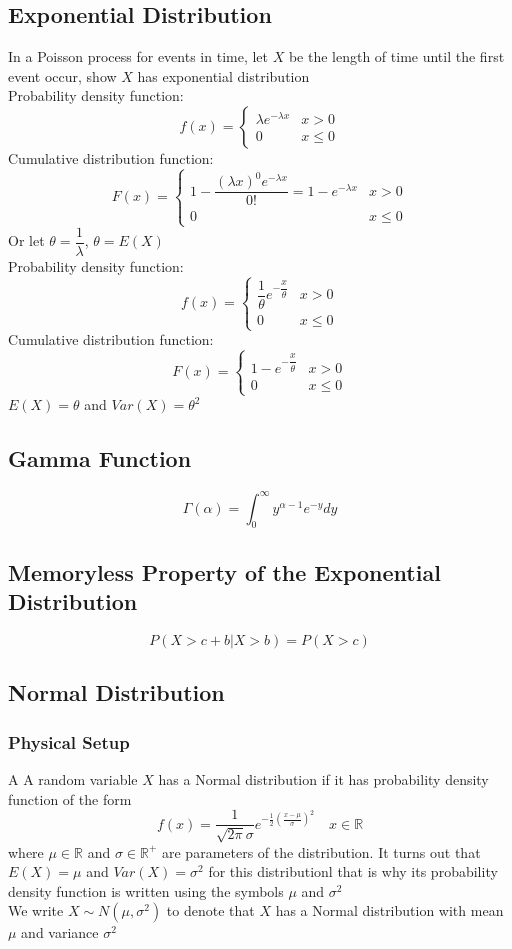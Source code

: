 \documentclass[11pt]{article}
\newcommand{\R}{{\mathbb{R}}}
\begin{document}
\subsection{Exponential Distribution}
In a Poisson process for events in time, let $X$ be the length of time until the first event occur, show $X$ has exponential distribution\\
Probability density function: \[f(x) = \begin{cases}
    \lambda e^{-\lambda x} &x>0 \\0 &x\leq 0
\end{cases}\]
Cumulative distribution function: \[F(x) = \begin{cases}
    1-\dfrac{(\lambda x)^0e^{-\lambda x}}{0!} = 1-e^{-\lambda x} &x>0 \\0 &x\leq 0
\end{cases}\]
Or let $\theta = \dfrac{1}{\lambda}$, $\theta = E(X)$ \\
Probability density function: \[f(x) = \begin{cases}
    \dfrac{1}{\theta} e^{-\dfrac{x}{\theta}} &x>0 \\0 &x\leq 0
\end{cases}\]
Cumulative distribution function: \[F(x) = \begin{cases}
    1-e^{-\dfrac{x}{\theta}} &x>0 \\0 &x\leq 0
\end{cases}\]
$E(X) = \theta$ and $Var(X) = \theta^2$
\subsection{Gamma Function}
\[\Gamma(\alpha) = \displaystyle\int_{0}^{\infty}y^{\alpha-1}e^{-y}dy\]
\subsection{Memoryless Property of the Exponential Distribution}
\[P(X>c+b|X>b) = P(X>c)\]
\subsection{Normal Distribution}
\subsubsection{Physical Setup}A
A random variable $X$ has a Normal distribution if it has probability density function of the form 
\[f(x) = \dfrac{1}{\sqrt{2\pi}\sigma}e^{-\frac{1}{2}(\frac{x-\mu}{\sigma})^2}\quad x\in\R\]
where $\mu\in\R$ and $\sigma\in\R^+$ are parameters of the distribution. It turns out that $E(X)=\mu$ and $Var(X)=\sigma^2$ 
for this distributionl that is why its probability density function is written using the symbols $\mu$ and $\sigma^2$ \\
We write $X\sim N(\mu, \sigma^2)$ to denote that $X$ has a Normal distribution with mean $\mu$ and variance $\sigma^2$
\end{document}
